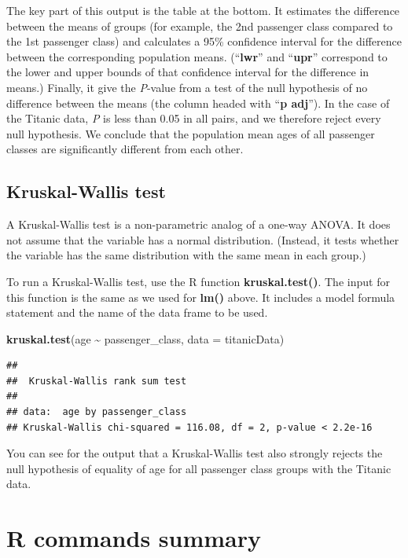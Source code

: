 \documentclass[
]{article}
\newenvironment{Shaded}{\begin{snugshade}}{\end{snugshade}}
\newcommand{\AttributeTok}[1]{\textcolor[rgb]{0.13,0.29,0.53}{#1}}
\newcommand{\FunctionTok}[1]{\textcolor[rgb]{0.13,0.29,0.53}{\textbf{#1}}}
\newcommand{\NormalTok}[1]{#1}
\newcommand{\SpecialCharTok}[1]{\textcolor[rgb]{0.81,0.36,0.00}{\textbf{#1}}}
\begin{document}
The key part of this output is the table at the bottom. It estimates the
difference between the means of groups (for example, the 2nd passenger
class compared to the 1st passenger class) and calculates a 95\%
confidence interval for the difference between the corresponding
population means. (``\textbf{lwr}'' and ``\textbf{upr}'' correspond to
the lower and upper bounds of that confidence interval for the
difference in means.) Finally, it give the \emph{P}-value from a test of
the null hypothesis of no difference between the means (the column
headed with ``\textbf{p adj}''). In the case of the Titanic data,
\emph{P} is less than 0.05 in all pairs, and we therefore reject every
null hypothesis. We conclude that the population mean ages of all
passenger classes are significantly different from each other.

\subsection{Kruskal-Wallis test}\label{kruskal-wallis-test}

A Kruskal-Wallis test is a non-parametric analog of a one-way ANOVA. It
does not assume that the variable has a normal distribution. (Instead,
it tests whether the variable has the same distribution with the same
mean in each group.)

To run a Kruskal-Wallis test, use the R function
\textbf{kruskal.test()}. The input for this function is the same as we
used for \textbf{lm()} above. It includes a model formula statement and
the name of the data frame to be used.

\begin{Shaded}
\begin{Highlighting}[]
\FunctionTok{kruskal.test}\NormalTok{(age }\SpecialCharTok{\textasciitilde{}}\NormalTok{ passenger\_class, }\AttributeTok{data =}\NormalTok{ titanicData)}
\end{Highlighting}
\end{Shaded}

\begin{verbatim}
## 
##  Kruskal-Wallis rank sum test
## 
## data:  age by passenger_class
## Kruskal-Wallis chi-squared = 116.08, df = 2, p-value < 2.2e-16
\end{verbatim}

You can see for the output that a Kruskal-Wallis test also strongly
rejects the null hypothesis of equality of age for all passenger class
groups with the Titanic data.

\section{R commands summary}\label{r-commands-summary}
\end{document}
